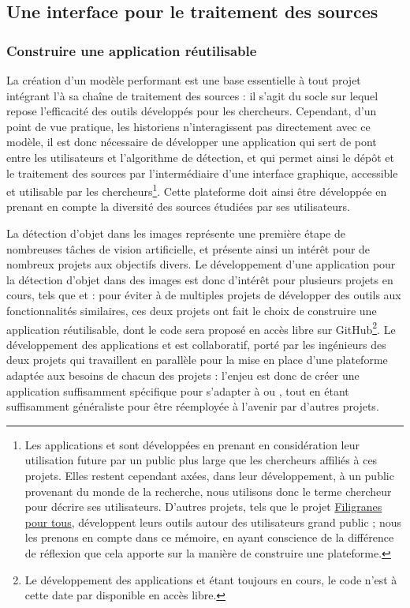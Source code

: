 
\subsection{Une interface pour le traitement des sources}
    \subsubsection{Construire une application réutilisable}
    La création d'un modèle performant est une base essentielle à tout projet intégrant l'\ia à sa chaîne de traitement des sources : il s'agit du socle sur lequel repose l'efficacité des outils développés pour les chercheurs. Cependant, d'un point de vue pratique, les historiens n'interagissent pas directement avec ce modèle, il est donc nécessaire de développer une application qui sert de pont entre les utilisateurs et l'algorithme de détection, et qui permet ainsi le dépôt et le traitement des sources par l'intermédiaire d'une interface graphique, accessible et utilisable par les chercheurs\footnote{Les applications \eida et \vhs sont développées en prenant en considération leur utilisation future par un public plus large que les chercheurs affiliés à ces projets. Elles restent cependant axées, dans leur développement, à un public provenant du monde de la recherche, nous utilisons donc le terme \og chercheur \fg pour décrire ses utilisateurs. D'autres projets, tels que le projet \href{https://filigranes.hypotheses.org/}{Filigranes pour tous}, développent leurs outils autour des utilisateurs grand public ; nous les prenons en compte dans ce mémoire, en ayant conscience de la différence de réflexion que cela apporte sur la manière de construire une plateforme.}. Cette plateforme doit ainsi être développée en prenant en compte la diversité des sources étudiées par ses utilisateurs.
    
    La détection d'objet dans les images représente une première étape de nombreuses tâches de vision artificielle, et présente ainsi un intérêt pour de nombreux projets aux objectifs divers. Le développement d'une application pour la détection d'objet dans des images est donc d'intérêt pour plusieurs projets en cours, tels que \vhs et \eida : pour éviter à de multiples projets de développer des outils aux fonctionnalités similaires, ces deux projets ont fait le choix de construire une application réutilisable, dont le code sera proposé en accès libre sur GitHub\footnote{Le développement des applications \eida et \vhs étant toujours en cours, le code n'est à cette date par disponible en accès libre.}. Le développement des applications \eida et \vhs est collaboratif, porté par les ingénieurs des deux projets qui travaillent en parallèle pour la mise en place d'une plateforme adaptée aux besoins de chacun des projets : l'enjeu est donc de créer une application suffisamment spécifique pour s'adapter à \eida ou \vhs, tout en étant suffisamment généraliste pour être réemployée à l'avenir par d'autres projets.
    

